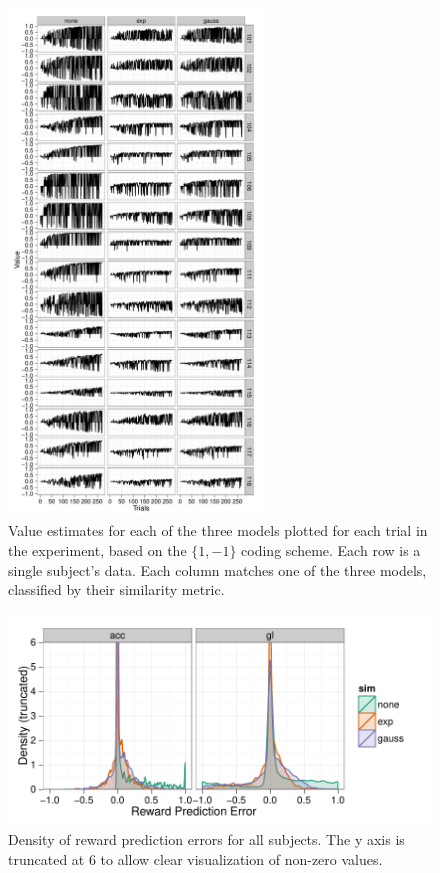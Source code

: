\documentclass[doc,12pt]{apa}        %
\begin{document}
\begin{figure}[tp]
	\includegraphics[width=0.6\textwidth]{f_value_gl}
    \centering
	\caption{Value estimates for each of the three models plotted for each trial in the experiment, based on the $\{1,-1\}$ coding scheme.   Each row is a single subject's data.  Each column matches one of the three models, classified by their similarity metric.}
	\label{fig:valuegl}
\end{figure}
\begin{figure}[tp]
	\includegraphics{f_density_rpe}
    \centering
    \caption{Density of reward prediction errors for all subjects.  The y axis is truncated at 6 to allow clear visualization of non-zero values.}
	\label{fig:denrpe}
\end{figure}
\end{document}
